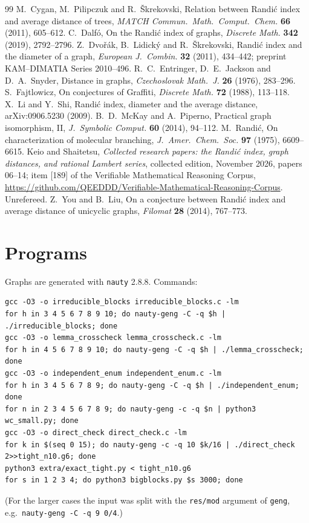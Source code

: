 \documentclass[11pt,a4paper]{article}
\theoremstyle{definition}
\theoremstyle{remark}
\numberwithin{equation}{section}
\begin{document}
\begin{thebibliography}{99}
 M.~Cygan, M.~Pilipczuk and R.~\v{S}krekovski, Relation between Randi\'c index and average distance of trees, \emph{MATCH Commun.\ Math.\ Comput.\ Chem.} \textbf{66} (2011), 605--612.
 C.~Dalf\'o, On the Randi\'c index of graphs, \emph{Discrete Math.} \textbf{342} (2019), 2792--2796.
 Z.~Dvo\v{r}\'ak, B.~Lidick\'y and R.~\v{S}krekovski, Randi\'c index and the diameter of a graph, \emph{European J.\ Combin.} \textbf{32} (2011), 434--442; preprint KAM--DIMATIA Series 2010--496.
 R.~C.~Entringer, D.~E.~Jackson and D.~A.~Snyder, Distance in graphs, \emph{Czechoslovak Math.\ J.} \textbf{26} (1976), 283--296.
 S.~Fajtlowicz, On conjectures of Graffiti, \emph{Discrete Math.} \textbf{72} (1988), 113--118.
 X.~Li and Y.~Shi, Randi\'c index, diameter and the average distance, arXiv:0906.5230 (2009).
 B.~D.~McKay and A.~Piperno, Practical graph isomorphism, II, \emph{J.\ Symbolic Comput.} \textbf{60} (2014), 94--112.
 M.~Randi\'c, On characterization of molecular branching, \emph{J.\ Amer.\ Chem.\ Soc.} \textbf{97} (1975), 6609--6615.
 Keio and Shaitetsu, \emph{Collected research papers: the Randi\'c index, graph distances, and rational Lambert series}, collected edition, November 2026, papers 06--14; item [189] of the Verifiable Mathematical Reasoning Corpus, \url{https://github.com/QEEDDD/Verifiable-Mathematical-Reasoning-Corpus}. Unrefereed.
 Z.~You and B.~Liu, On a conjecture between Randi\'c index and average distance of unicyclic graphs, \emph{Filomat} \textbf{28} (2014), 767--773.
\end{thebibliography}

\appendix
\section{Programs}\label{app:code}
Graphs are generated with \texttt{nauty} 2.8.8. Commands:
\begin{lstlisting}
gcc -O3 -o irreducible_blocks irreducible_blocks.c -lm
for h in 3 4 5 6 7 8 9 10; do nauty-geng -C -q $h | ./irreducible_blocks; done
gcc -O3 -o lemma_crosscheck lemma_crosscheck.c -lm
for h in 4 5 6 7 8 9 10; do nauty-geng -C -q $h | ./lemma_crosscheck; done
gcc -O3 -o independent_enum independent_enum.c -lm
for h in 3 4 5 6 7 8 9; do nauty-geng -C -q $h | ./independent_enum; done
for n in 2 3 4 5 6 7 8 9; do nauty-geng -c -q $n | python3 wc_small.py; done
gcc -O3 -o direct_check direct_check.c -lm
for k in $(seq 0 15); do nauty-geng -c -q 10 $k/16 | ./direct_check 2>>tight_n10.g6; done
python3 extra/exact_tight.py < tight_n10.g6
for s in 1 2 3 4; do python3 bigblocks.py $s 3000; done
\end{lstlisting}
(For the larger cases the input was split with the \texttt{res/mod} argument of
\texttt{geng}, e.g.\ \texttt{nauty-geng -C -q 9 0/4}.)
\end{document}
